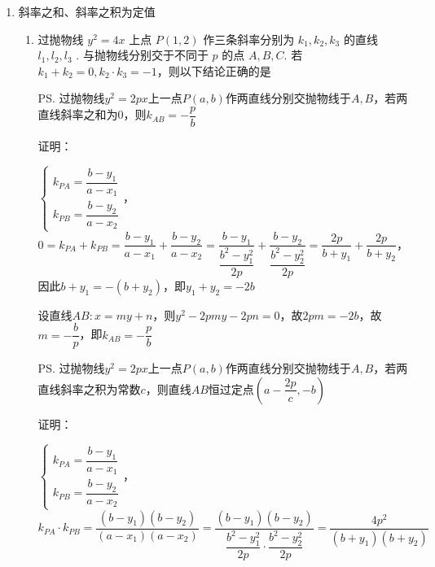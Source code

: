 \begin{enumerate}
\begin{enumerate}
\begin{jieda}
\begin{enumerate}
                所以当 $x = 2$ 时, $f\left( x\right)$ 取得最小值,即当 $t =  \pm  \sqrt{2}$ 时, $\left| {AC}\right|  + \left| {BD}\right|$ 的最小值为 ${12}\sqrt{3}$ .
            \end{enumerate}
        \end{jieda}
    \end{enumerate}
    \item 斜率之和、斜率之积为定值
    \begin{enumerate}
        \item 过抛物线 ${y^2} = {4x}$ 上点 $P\left( {1,2}\right)$ 作三条斜率分别为 ${k}_{1},{k}_{2},{k}_{3}$ 的直线 ${l}_{1},{l}_{2},{l}_{3}$ . 与抛物线分别交于不同于 $p$ 的点 $A,B,C$. 若 ${k}_{1} + {k}_{2} = 0,{k}_{2} \cdot  {k}_{3} =  - 1$，则以下结论正确的是
        \begin{jieda}
            \ps 过抛物线$y^2 = 2px$上一点$P(a, b)$作两直线分别交抛物线于$A, B$，若两直线斜率之和为0，则$k_{AB} = -\dfrac{p}{b}$ 

            证明：

            $\left\{\begin{array}{l}
                k_{PA} = \dfrac{b-y_1}{a - x_1} \\
                k_{PB} = \dfrac{b-y_2}{a - x_2}
            \end{array}\right.$，$0 = k_{PA} + k_{PB} = \dfrac{b-y_1}{a - x_1} + \dfrac{b-y_2}{a - x_2} = \dfrac{b-y_1}{\dfrac{b^2-y_1^2}{2p}} + \dfrac{b-y_2}{\dfrac{b^2-y_2^2}{2p}} = \dfrac{2p}{b+y_1} + \dfrac{2p}{b+y_2}$，因此$b+y_1 = -(b+y_2)$，即$y_1+y_2 = -2b$
            
            设直线$AB: x = my + n$，则$y^2 - 2pmy - 2pn = 0$，故$2pm = -2b$，故$m = -\dfrac{b}{p}$，即$k_{AB} = -\dfrac{p}{b}$ 

            \ps 过抛物线$y^2 = 2px$上一点$P(a, b)$作两直线分别交抛物线于$A, B$，若两直线斜率之积为常数$c$，则直线$AB$恒过定点$\left(a-\dfrac{2p}{c}, -b\right)$

            证明：

            $\left\{\begin{array}{l}
                k_{PA} = \dfrac{b-y_1}{a - x_1} \\
                k_{PB} = \dfrac{b-y_2}{a - x_2}
            \end{array}\right.$，$k_{PA} \cdot k_{PB} = \dfrac{(b-y_1)(b-y_2)}{(a-x_1)(a-x_2)} = \dfrac{(b-y_1)(b-y_2)}{\dfrac{b^2-y_1^2}{2p} \cdot \dfrac{b^2-y_2^2}{2p}} = \dfrac{4p^2}{(b+y_1)(b+y_2)}$


\end{jieda}
\end{enumerate}
\end{enumerate}
